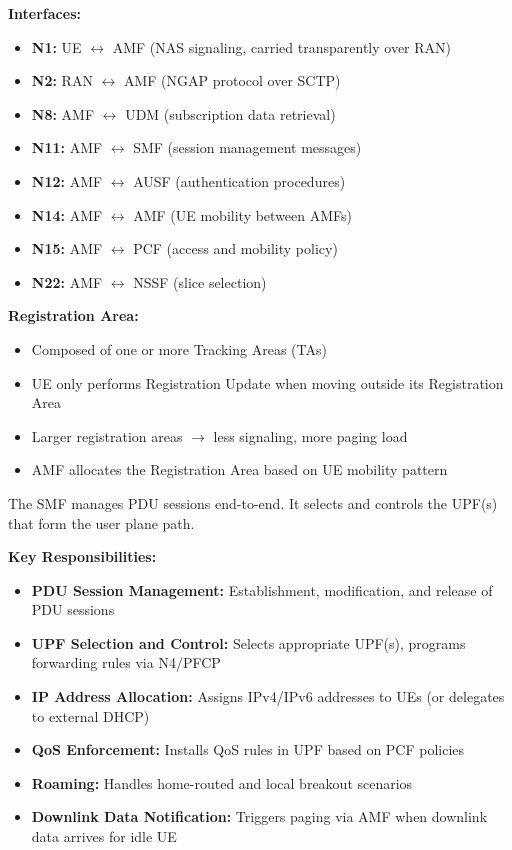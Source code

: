 \textbf{Interfaces:}

\begin{itemize}
\tightlist
\item
  \textbf{N1:} UE \ensuremath{\leftrightarrow} AMF (NAS signaling, carried transparently over RAN)
\item
  \textbf{N2:} RAN \ensuremath{\leftrightarrow} AMF (NGAP protocol over SCTP)
\item
  \textbf{N8:} AMF \ensuremath{\leftrightarrow} UDM (subscription data retrieval)
\item
  \textbf{N11:} AMF \ensuremath{\leftrightarrow} SMF (session management messages)
\item
  \textbf{N12:} AMF \ensuremath{\leftrightarrow} AUSF (authentication procedures)
\item
  \textbf{N14:} AMF \ensuremath{\leftrightarrow} AMF (UE mobility between AMFs)
\item
  \textbf{N15:} AMF \ensuremath{\leftrightarrow} PCF (access and mobility policy)
\item
  \textbf{N22:} AMF \ensuremath{\leftrightarrow} NSSF (slice selection)
\end{itemize}

\textbf{Registration Area:}

\begin{itemize}
\tightlist
\item
  Composed of one or more Tracking Areas (TAs)
\item
  UE only performs Registration Update when moving outside its Registration Area
\item
  Larger registration areas \ensuremath{\to} less signaling, more paging load
\item
  AMF allocates the Registration Area based on UE mobility pattern
\end{itemize}


The SMF manages PDU sessions end-to-end. It selects and controls the UPF(s) that form the user plane path.

\textbf{Key Responsibilities:}

\begin{itemize}
\tightlist
\item
  \textbf{PDU Session Management:} Establishment, modification, and release of PDU sessions
\item
  \textbf{UPF Selection and Control:} Selects appropriate UPF(s), programs forwarding rules via N4/\allowbreak{}PFCP
\item
  \textbf{IP Address Allocation:} Assigns IPv4/\allowbreak{}IPv6 addresses to UEs (or delegates to external DHCP)
\item
  \textbf{QoS Enforcement:} Installs QoS rules in UPF based on PCF policies
\item
  \textbf{Roaming:} Handles home-routed and local breakout scenarios
\item
  \textbf{Downlink Data Notification:} Triggers paging via AMF when downlink data arrives for idle UE
\end{itemize}

